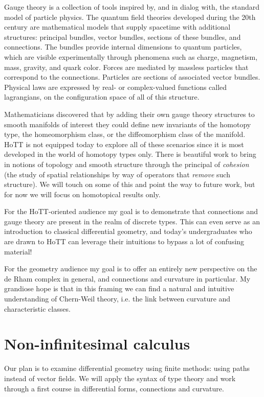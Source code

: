 \documentclass[12pt]{article}
\begin{document}
Gauge theory is a collection of tools inspired by, and in dialog with, the standard model of particle physics. The quantum field theories developed during the 20th century are mathematical models that supply spacetime with additional structures: principal bundles, vector bundles, sections of these bundles, and connections. The bundles provide internal dimensions to quantum particles, which are visible experimentally through phenomena such as charge, magnetism, mass, gravity, and quark color. Forces are mediated by massless particles that correspond to the connections. Particles are sections of associated vector bundles. Physical laws are expressed by real- or complex-valued functions called lagrangians, on the configuration space of all of this structure.

Mathematicians discovered that by adding their own gauge theory structures to smooth manifolds of interest they could define new invariants of the homotopy type, the homeomorphism class, or the diffeomorphism class of the manifold. HoTT is not equipped today to explore all of these scenarios since it is most developed in the world of homotopy types only. There is beautiful work to bring in notions of topology and smooth structure through the principal of \emph{cohesion} (the study of spatial relationships by way of operators that \emph{remove} such structure). We will touch on some of this and point the way to future work, but for now we will focus on homotopical results only. 

For the HoTT-oriented audience my goal is to demonstrate that connections and gauge theory are present in the realm of discrete types. This can even serve as an introduction to classical differential geometry, and today's undergraduates who are drawn to HoTT can leverage their intuitions to bypass a lot of confusing material!

For the geometry audience my goal is to offer an entirely new perspective on the de Rham complex in general, and connections and curvature in particular. My grandiose hope is that in this framing we can find a natural and intuitive understanding of Chern-Weil theory, i.e. the link between curvature and characteristic classes. 



\section{Non-infinitesimal calculus}

Our plan is to examine differential geometry using finite methods: using paths instead of vector fields. We will apply the syntax of type theory and work through a first course in differential forms, connections and curvature.
\end{document}
